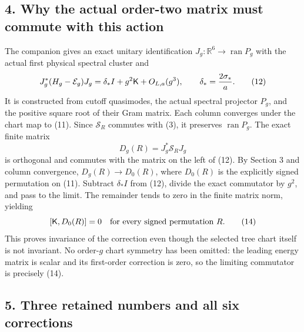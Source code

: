 \documentclass[
  11pt,
]{article}
\begin{document}
\subsection{4. Why the actual order-two matrix must commute with this
action}\label{weak-coupling-part-16-why-the-actual-order-two-matrix-must-commute-with-this-action}

The companion gives an exact unitary identification
\(J_g:\mathbb R^6\to\operatorname{ran}P_g\) with the actual first
physical spectral cluster and \[
 J_g^*(H_g-\mathcal E_g)J_g
          =\delta_*I+g^2\mathsf K+O_{L,a}(g^3),\qquad
                         \delta_*={2\sigma_*\over a}.
 \tag{12}
\] It is constructed from cutoff quasimodes, the actual spectral
projector \(P_g\), and the positive square root of their Gram matrix.
Each column converges under the chart map to (11). Since
\(\mathscr S_R\) commutes with (3), it preserves
\(\operatorname{ran}P_g\). The exact finite matrix \[
 D_g(R)=J_g^*\mathscr S_RJ_g
 \tag{13}
\] is orthogonal and commutes with the matrix on the left of (12). By
Section 3 and column convergence, \(D_g(R)\to D_0(R)\), where \(D_0(R)\)
is the explicitly signed permutation on (11). Subtract \(\delta_*I\)
from (12), divide the exact commutator by \(g^2\), and pass to the
limit. The remainder tends to zero in the finite matrix norm, yielding
\[
                     [\mathsf K,D_0(R)]=0
               \quad\hbox{for every signed permutation }R.
 \tag{14}
\] This proves invariance of the correction even though the selected
tree chart itself is not invariant. No order-\(g\) chart symmetry has
been omitted: the leading energy matrix is scalar and its first-order
correction is zero, so the limiting commutator is precisely (14).

\subsection{5. Three retained numbers and all six
corrections}\label{weak-coupling-part-16-three-retained-numbers-and-all-six-corrections}
\end{document}
